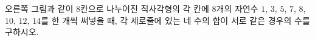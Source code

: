 \noindent\begin{minipage}[t]{0.66\linewidth}\vspace{0pt}\raggedright 오른쪽 그림과 같이 $8$칸으로 나누어진 직사각형의 각 칸에 $8$개의 자연수 $1$, $3$, $5$, $7$, $8$, $10$, $12$, $14$를 한 개씩 써넣을 때, 각 세로줄에 있는 네 수의 합이 서로 같은 경우의 수를 구하시오.\end{minipage}\hfill\begin{minipage}[t]{0.3\linewidth}\vspace{0pt}\end{minipage}
